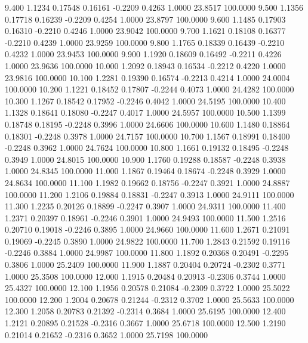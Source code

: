    9.400   1.1234   0.17548   0.16161  -0.2209   0.4263   1.0000  23.8517 100.0000
   9.500   1.1356   0.17718   0.16239  -0.2209   0.4254   1.0000  23.8797 100.0000
   9.600   1.1485   0.17903   0.16310  -0.2210   0.4246   1.0000  23.9042 100.0000
   9.700   1.1621   0.18108   0.16377  -0.2210   0.4239   1.0000  23.9259 100.0000
   9.800   1.1765   0.18339   0.16439  -0.2210   0.4232   1.0000  23.9453 100.0000
   9.900   1.1920   0.18609   0.16492  -0.2211   0.4226   1.0000  23.9636 100.0000
  10.000   1.2092   0.18943   0.16534  -0.2212   0.4220   1.0000  23.9816 100.0000
  10.100   1.2281   0.19390   0.16574  -0.2213   0.4214   1.0000  24.0004 100.0000
  10.200   1.1221   0.18452   0.17807  -0.2244   0.4073   1.0000  24.4282 100.0000
  10.300   1.1267   0.18542   0.17952  -0.2246   0.4042   1.0000  24.5195 100.0000
  10.400   1.1328   0.18641   0.18080  -0.2247   0.4017   1.0000  24.5957 100.0000
  10.500   1.1399   0.18748   0.18195  -0.2248   0.3996   1.0000  24.6606 100.0000
  10.600   1.1480   0.18864   0.18301  -0.2248   0.3978   1.0000  24.7157 100.0000
  10.700   1.1567   0.18991   0.18400  -0.2248   0.3962   1.0000  24.7624 100.0000
  10.800   1.1661   0.19132   0.18495  -0.2248   0.3949   1.0000  24.8015 100.0000
  10.900   1.1760   0.19288   0.18587  -0.2248   0.3938   1.0000  24.8345 100.0000
  11.000   1.1867   0.19464   0.18674  -0.2248   0.3929   1.0000  24.8634 100.0000
  11.100   1.1982   0.19662   0.18756  -0.2247   0.3921   1.0000  24.8887 100.0000
  11.200   1.2106   0.19884   0.18831  -0.2247   0.3913   1.0000  24.9111 100.0000
  11.300   1.2235   0.20126   0.18899  -0.2247   0.3907   1.0000  24.9311 100.0000
  11.400   1.2371   0.20397   0.18961  -0.2246   0.3901   1.0000  24.9493 100.0000
  11.500   1.2516   0.20710   0.19018  -0.2246   0.3895   1.0000  24.9660 100.0000
  11.600   1.2671   0.21091   0.19069  -0.2245   0.3890   1.0000  24.9822 100.0000
  11.700   1.2843   0.21592   0.19116  -0.2246   0.3884   1.0000  24.9987 100.0000
  11.800   1.1892   0.20368   0.20491  -0.2295   0.3806   1.0000  25.2409 100.0000
  11.900   1.1887   0.20404   0.20724  -0.2302   0.3771   1.0000  25.3508 100.0000
  12.000   1.1915   0.20484   0.20913  -0.2306   0.3744   1.0000  25.4327 100.0000
  12.100   1.1956   0.20578   0.21084  -0.2309   0.3722   1.0000  25.5022 100.0000
  12.200   1.2004   0.20678   0.21244  -0.2312   0.3702   1.0000  25.5633 100.0000
  12.300   1.2058   0.20783   0.21392  -0.2314   0.3684   1.0000  25.6195 100.0000
  12.400   1.2121   0.20895   0.21528  -0.2316   0.3667   1.0000  25.6718 100.0000
  12.500   1.2190   0.21014   0.21652  -0.2316   0.3652   1.0000  25.7198 100.0000
